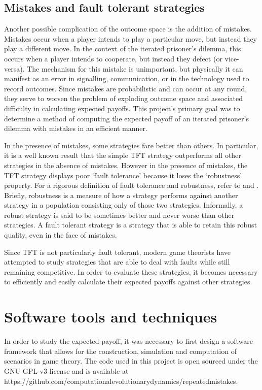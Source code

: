 \documentclass[a4paper,12pt]{article}
\begin{document}
\subsection{Mistakes and fault tolerant strategies}

Another possible complication of the outcome space is the addition of mistakes.
Mistakes occur when a player intends to play a particular move, but instead they play a different move.
In the context of the iterated prisoner's dilemma, this occurs when a player intends to cooperate, but instead they defect (or vice-versa).
The mechanism for this mistake is unimportant, but physically it can manifest as an error in signalling, communication, or in the technology used to record outcomes.
Since mistakes are probabilistic and can occur at any round, they serve to worsen the problem of exploding outcome space and associated difficulty in calculating expected payoffs.
This project's primary goal was to determine a method of computing the expected payoff of an iterated prisoner's dilemma with mistakes in an efficient manner.

In the presence of mistakes, some strategies fare better than others.
In particular, it is a well known result \cite{axelrod} that the simple TFT strategy outperforms all other strategies in the absence of mistakes.
However in the presence of mistakes, the TFT strategy displays poor `fault tolerance' because it loses the `robustness' property.
For a rigorous definition of fault tolerance and robustness, refer to \cite{pelc} and \cite{pelcpelc}.
Briefly, robustness is a measure of how a strategy performs against another strategy in a population consisting only of those two strategies.
Informally, a robust strategy is said to be sometimes better and never worse than other strategies.
A fault tolerant strategy is a strategy that is able to retain this robust quality, even in the face of mistakes.

Since TFT is not particularly fault tolerant, modern game theorists have attempted to study strategies that are able to deal with faults while still remaining competitive.
In order to evaluate these strategies, it becomes necessary to efficiently and easily calculate their expected payoffs against other strategies.

\section{Software tools and techniques}

In order to study the expected payoff, it was necessary to first design a software framework that allows for the construction, simulation and computation of scenarios in game theory.
The code used in this project is open sourced under the GNU GPL v3 license and is available at https://github.com/computationalevolutionarydynamics/repeatedmistakes.
\end{document}
